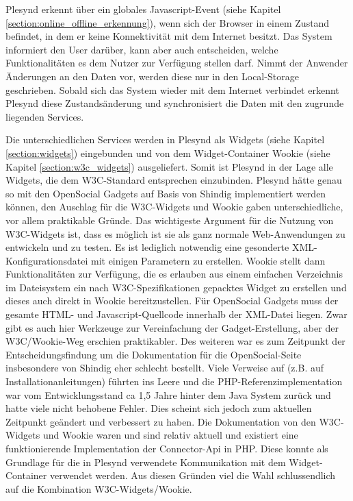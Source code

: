 Plesynd erkennt über ein globales Javascript-Event (siehe Kapitel \ref{section:online_offline_erkennung}), wenn sich der Browser in einem Zustand befindet, in dem er keine Konnektivität mit dem Internet besitzt. Das System informiert den User darüber, kann aber auch entscheiden, welche Funktionalitäten es dem Nutzer zur Verfügung stellen darf. Nimmt der Anwender Änderungen an den Daten vor, werden diese nur in den Local-Storage geschrieben. Sobald sich das System wieder mit dem Internet verbindet erkennt Plesynd diese Zustandsänderung und synchronisiert die Daten mit den zugrunde liegenden Services. 

Die unterschiedlichen Services werden in Plesynd als Widgets (siehe Kapitel \ref{section:widgets}) eingebunden und von dem Widget-Container Wookie (siehe Kapitel \ref{section:w3c_widgets}) ausgeliefert. Somit ist Plesynd in der Lage alle Widgets, die dem W3C-Standard entsprechen einzubinden. Plesynd hätte genau so mit den OpenSocial Gadgets auf Basis von Shindig implementiert werden können, den Auschlag für die W3C-Widgets und Wookie gaben unterschiedliche, vor allem praktikable Gründe. Das wichtigeste Argument für die Nutzung von W3C-Widgets ist, dass es möglich ist sie als ganz normale Web-Anwendungen zu entwickeln und zu testen. Es ist lediglich notwendig eine gesonderte XML-Konfigurationsdatei mit einigen Parametern zu erstellen. Wookie stellt dann Funktionalitäten zur Verfügung, die es erlauben aus einem einfachen Verzeichnis im Dateisystem ein nach W3C-Spezifikationen gepacktes Widget zu erstellen und dieses auch direkt in Wookie bereitzustellen. Für OpenSocial Gadgets muss der gesamte HTML- und Javascript-Quellcode innerhalb der XML-Datei liegen. Zwar gibt es auch hier Werkzeuge zur Vereinfachung der Gadget-Erstellung, aber der W3C/Wookie-Weg erschien praktikabler. Des weiteren war es zum Zeitpunkt der Entscheidungsfindung um die Dokumentation für die OpenSocial-Seite insbesondere von Shindig eher schlecht bestellt. Viele Verweise auf (z.B. auf Installationanleitungen) führten ins Leere und die PHP-Referenzimplementation war vom Entwicklungsstand ca 1,5 Jahre hinter dem Java System zurück und hatte viele nicht behobene Fehler. Dies scheint sich jedoch zum aktuellen Zeitpunkt geändert und verbessert zu haben. Die Dokumentation von den W3C-Widgets und Wookie waren und sind relativ aktuell und existiert eine funktionierende Implementation der Connector-Api in PHP. Diese konnte als Grundlage für die in Plesynd verwendete Kommunikation mit dem Widget-Container verwendet werden. Aus diesen Gründen viel die Wahl schlussendlich auf die Kombination W3C-Widgets/Wookie.

